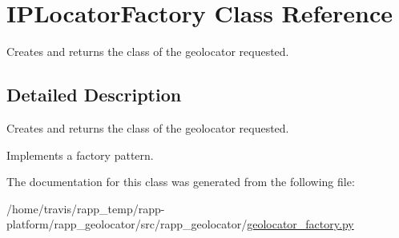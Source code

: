 \hypertarget{classIPLocatorFactory}{\section{I\-P\-Locator\-Factory Class Reference}
\label{classIPLocatorFactory}
}


Creates and returns the class of the geolocator requested.  




\subsection{Detailed Description}
Creates and returns the class of the geolocator requested. 

Implements a factory pattern. 

The documentation for this class was generated from the following file\-:\begin{DoxyCompactItemize}
\item 
/home/travis/rapp\-\_\-temp/rapp-\/platform/rapp\-\_\-geolocator/src/rapp\-\_\-geolocator/\hyperlink{geolocator__factory_8py}{geolocator\-\_\-factory.\-py}\end{DoxyCompactItemize}
